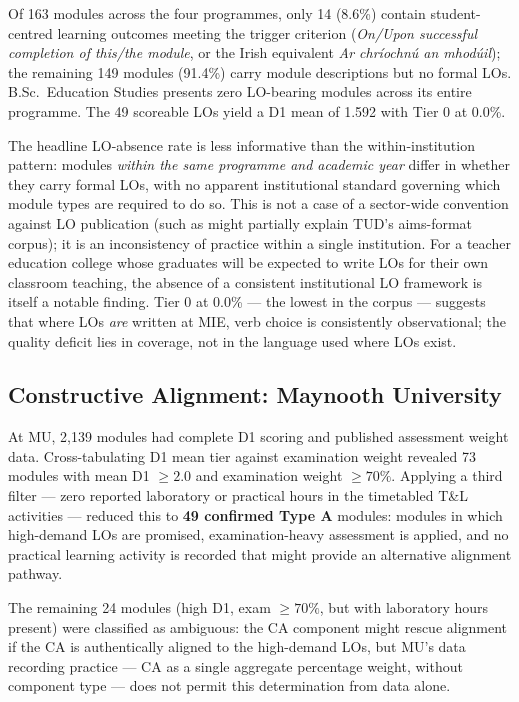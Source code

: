 \documentclass[12pt, a4paper]{article}
\begin{document}
Of 163 modules across the four programmes, only 14 (8.6\%) contain student-centred
learning outcomes meeting the trigger criterion (\textit{On/Upon successful completion
of this/the module}, or the Irish equivalent \textit{Ar chríochnú an mhodúil});
the remaining 149 modules (91.4\%) carry module descriptions but no formal LOs.
B.Sc.\ Education Studies presents zero LO-bearing modules across its entire
programme. The 49 scoreable LOs yield a D1 mean of 1.592 with Tier 0 at 0.0\%.

The headline LO-absence rate is less informative than the within-institution
pattern: modules \textit{within the same programme and academic year} differ in
whether they carry formal LOs, with no apparent institutional standard governing
which module types are required to do so. This is not a case of a sector-wide
convention against LO publication (such as might partially explain TUD's
aims-format corpus); it is an inconsistency of practice within a single institution.
For a teacher education college whose graduates will be expected to write LOs for
their own classroom teaching, the absence of a consistent institutional LO
framework is itself a notable finding. Tier 0 at 0.0\% --- the lowest in the
corpus --- suggests that where LOs \textit{are} written at MIE, verb choice is
consistently observational; the quality deficit lies in coverage, not in
the language used where LOs exist.

\subsection{Constructive Alignment: Maynooth University}

At MU, 2,139 modules had complete D1 scoring and published assessment weight data.
Cross-tabulating D1 mean tier against examination weight revealed 73 modules with
mean D1 $\geq 2.0$ and examination weight $\geq 70\%$. Applying a third filter ---
zero reported laboratory or practical hours in the timetabled T\&L activities ---
reduced this to \textbf{49 confirmed Type A} modules: modules in which high-demand
LOs are promised, examination-heavy assessment is applied, and no practical learning
activity is recorded that might provide an alternative alignment pathway.

The remaining 24 modules (high D1, exam $\geq 70\%$, but with laboratory hours
present) were classified as ambiguous: the CA component might rescue alignment
if the CA is authentically aligned to the high-demand LOs, but MU's data recording
practice --- CA as a single aggregate percentage weight, without component type ---
does not permit this determination from data alone.
\end{document}
